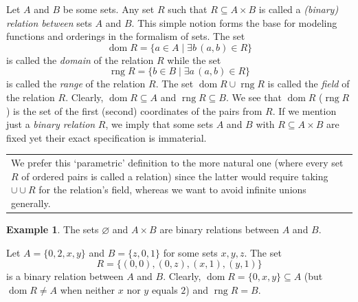 \documentclass[12pt,notitlepage]{article}
\theoremstyle{plain}
\theoremstyle{definition}
\newtheorem{exm}[thm]{Example}
\theoremstyle{plain}
\newcommand{\sbs}{\subseteq}
\newcommand{\void}{\varnothing}
\newcommand{\dom}{\mathop{\mathrm{dom}}}
\newcommand{\rng}{\mathop{\mathrm{rng}}}
\newcommand{\1}{\mathbf{1}}
\newcommand{\0}{\mathbf{0}}
\newcommand{\mcomm}[1]{
\medskip\noindent\begin{tabular}{| l}
\parbox{0.99\textwidth}{{\small
#1 }}\end{tabular}
\smallskip}
\begin{document}
Let $A$ and $B$ be some sets. Any set $R$ such that $R \sbs A \times B$ is called a \emph{(binary) relation between} sets $A$ and $B$. This simple notion forms the base for modeling functions and orderings in the formalism of sets. The set
$$\dom R = \{a \in A \mid \exists b\, (a, b) \in R \}$$
is called the \emph{domain} of the relation $R$ while the set
$$\rng R = \{b \in B \mid \exists a\, (a, b) \in R \}$$
is called the \emph{range} of the relation $R$. The set $\dom R \cup \rng R$ is called the \emph{field} of the relation $R$. Clearly, $\dom R \sbs A$ and $\rng R \sbs B$. We see that $\dom R$ ($\rng R$) is the set of the first (second) coordinates of the pairs from $R$. If we mention just a \emph{binary relation} $R$, we imply that some sets $A$ and $B$ with $R \sbs A \times B$ are fixed yet their exact specification is immaterial.

\mcomm{We prefer this `parametric' definition to the more natural one (where every set $R$ of ordered pairs is called a relation) since the latter would require taking ${\cup} {\cup} R$ for the relation's field, whereas we want to avoid infinite unions generally.}

\begin{exm}\label{rel:exm_rel}
The sets $\void$ and $A \times B$ are binary relations between $A$ and $B$.

Let $A = \{0,2, x, y\}$ and $B = \{z, 0, 1\}$ for some sets $x, y, z$. The set
$$R = \{ (0, 0), (0,z), (x, 1), (y,1) \}$$
is a binary relation between $A$ and $B$. Clearly, $\dom R = \{0,x,y\} \sbs A$ (but $\dom R \neq A$ when neither $x$ nor $y$ equals $2$) and $\rng R = B$.
\end{exm}
\end{document}
